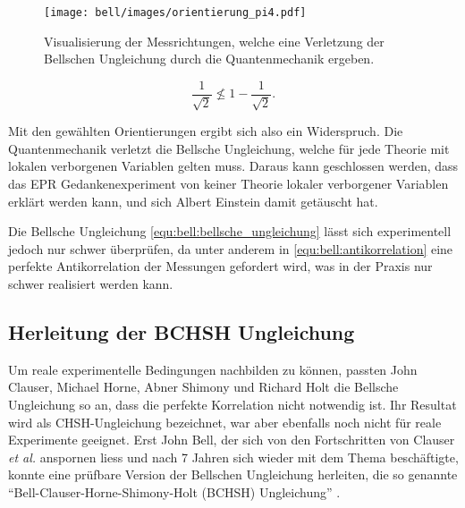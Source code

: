 \begin{refsection}
\begin{figure}
    \centering
    \texttt{[image: bell/images/orientierung\_pi4.pdf]}
    \caption{Visualisierung der Messrichtungen, welche eine Verletzung der
    Bellschen Ungleichung durch die Quantenmechanik ergeben.}
    \label{fig:bell:orientierung_pi4}
\end{figure}

\[
    \frac{1}{\sqrt{2}} \nleqslant 1 - \frac{1}{\sqrt{2}}.
\]

Mit den gew\"ahlten Orientierungen ergibt sich also ein Widerspruch. 
Die Quantenmechanik verletzt die Bellsche Ungleichung, welche f\"ur jede Theorie
mit lokalen verborgenen Variablen gelten muss.
Daraus kann geschlossen werden, dass das EPR Gedankenexperiment von keiner
Theorie lokaler verborgener Variablen erkl\"art werden kann, und sich Albert
Einstein damit get\"auscht hat.

Die Bellsche Ungleichung \eqref{equ:bell:bellsche_ungleichung} l\"asst sich
experimentell jedoch nur schwer \"uberpr\"ufen, da unter anderem in
\eqref{equ:bell:antikorrelation} eine perfekte Antikorrelation der Messungen
gefordert wird, was in der Praxis nur schwer realisiert werden kann.

\subsection{Herleitung der BCHSH Ungleichung}
Um reale experimentelle Bedingungen nachbilden zu k\"onnen, passten
John Clauser, Michael Horne, Abner Shimony und Richard Holt 
\cite{Bell:Clauser1969} die Bellsche Ungleichung so an, dass die perfekte
Korrelation nicht notwendig ist.
Ihr Resultat wird als CHSH-Ungleichung bezeichnet, war aber ebenfalls noch nicht
f\"ur reale Experimente geeignet.
Erst John Bell, der sich von den Fortschritten von Clauser \textit{et al.}
anspornen liess und nach 7 Jahren sich wieder mit dem Thema besch\"aftigte,
konnte eine pr\"ufbare Version der Bellschen Ungleichung herleiten, die so
genannte \enquote{Bell-Clauser-Horne-Shimony-Holt (BCHSH) Ungleichung}
\cite{Bell:Bell1971}. 


\end{refsection}
